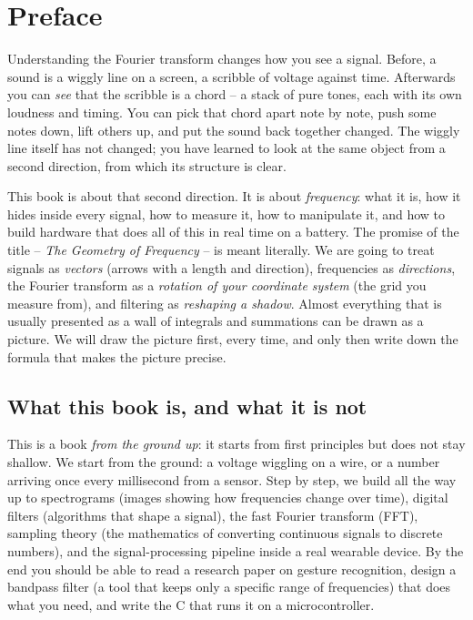 \chapter*{Preface}

Understanding the Fourier transform changes how you see a signal. Before, a sound is a
wiggly line on a screen, a scribble of voltage against time. Afterwards
you can \emph{see} that the scribble is a chord -- a stack of pure tones,
each with its own loudness and timing. You can pick that chord apart note
by note, push some notes down, lift others up, and put the sound back together changed.
The wiggly line itself has not changed; you have learned to look at
the same object from a second direction, from which its structure is
clear.

This book is about that second direction. It is about \emph{frequency}: what it
is, how it hides inside every signal, how to measure it, how to manipulate it, and
how to build hardware that does all of this in real time on a battery. The promise of
the title -- \emph{The Geometry of Frequency} -- is meant literally. We are going to
treat signals as \emph{vectors} (arrows with a length and direction), frequencies as \emph{directions}, the Fourier transform
as a \emph{rotation of your coordinate system} (the grid you measure from), and filtering as \emph{reshaping a shadow}.
Almost everything that is usually presented as a wall of integrals and summations can
be drawn as a picture. We will draw the picture first, every time, and only then write down
the formula that makes the picture precise.

\chapterline

\section*{What this book is, and what it is not}

This is a book \emph{from the ground up}: it starts from first principles but does not
stay shallow. We start from the ground: a voltage
wiggling on a wire, or a number arriving once every millisecond from a sensor. Step by step, we
build all the way up to spectrograms (images showing how frequencies change over time), digital filters (algorithms that shape a signal), the fast Fourier transform (FFT),
sampling theory (the mathematics of converting continuous signals to discrete numbers), and the signal-processing pipeline inside a real wearable device. By the
end you should be able to read a research paper on gesture recognition, design a bandpass
filter (a tool that keeps only a specific range of frequencies) that does what you need, and write the C that runs it on a microcontroller.

